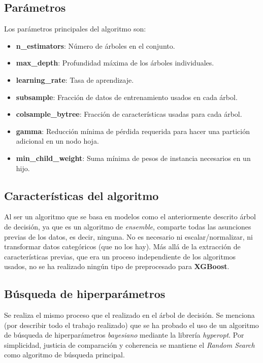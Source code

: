 \documentclass[12pt,letterpaper]{article}
\begin{document}
\subsection{Parámetros}
Los parámetros principales del algoritmo son:
\begin{itemize}
    \item \textbf{n\_estimators}: Número de árboles en el conjunto.
    \item \textbf{max\_depth}: Profundidad máxima de los árboles individuales. 
    \item \textbf{learning\_rate}: Tasa de aprendizaje.
    \item \textbf{subsample}: Fracción de datos de entrenamiento usados en cada árbol.
    \item \textbf{colsample\_bytree}: Fracción de características usadas para cada árbol. 
    \item \textbf{gamma}: Reducción mínima de pérdida requerida para hacer una partición adicional en un nodo hoja.
    \item \textbf{min\_child\_weight}: Suma mínima de pesos de instancia necesarios en un hijo.
\end{itemize}

\subsection{Características del algoritmo}
Al ser un algoritmo que se basa en modelos como el anteriormente descrito árbol de decisión, ya que es un algoritmo de \textit{ensemble}, comparte todas las asunciones previas de los datos, es decir, ninguna. No es necesario ni escalar/normalizar, ni transformar datos categóricos (que no los hay). Más allá de la extracción de características previas, que era un proceso independiente de los algoritmos usados, no se ha realizado ningún tipo de preprocesado para \textbf{XGBoost}.

\subsection{Búsqueda de hiperparámetros}
Se realiza el mismo proceso que el realizado en el árbol de decisión. Se menciona (por describir todo el trabajo realizado) que se ha probado el uso de un algoritmo de búsqueda de hiperparámetros \textit{bayesiano} mediante la librería \textit{hyperopt}. Por simplicidad, justicia de comparación y coherencia se mantiene el \textit{Random Search} como algoritmo de búsqueda principal.
\end{document}
